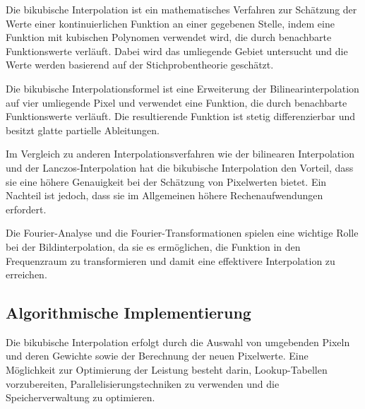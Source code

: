 Die bikubische Interpolation ist ein mathematisches Verfahren zur Schätzung der Werte einer kontinuierlichen Funktion an einer gegebenen Stelle, indem eine Funktion mit kubischen Polynomen verwendet wird, die durch benachbarte Funktionswerte verläuft.
Dabei wird das umliegende Gebiet untersucht und die Werte werden basierend auf der Stichprobentheorie geschätzt.

Die bikubische Interpolationsformel ist eine Erweiterung der Bilinearinterpolation auf vier umliegende Pixel und verwendet eine Funktion, die durch benachbarte Funktionswerte verläuft.
Die resultierende Funktion ist stetig differenzierbar und besitzt glatte partielle Ableitungen.

Im Vergleich zu anderen Interpolationsverfahren wie der bilinearen Interpolation und der Lanczos-Interpolation hat die bikubische Interpolation den Vorteil, dass sie eine höhere Genauigkeit bei der Schätzung von Pixelwerten bietet.
Ein Nachteil ist jedoch, dass sie im Allgemeinen höhere Rechenaufwendungen erfordert.

Die Fourier-Analyse und die Fourier-Transformationen spielen eine wichtige Rolle bei der Bildinterpolation, da sie es ermöglichen, die Funktion in den Frequenzraum zu transformieren und damit eine effektivere Interpolation zu erreichen.

\subsection{Algorithmische Implementierung}



    
Die bikubische Interpolation erfolgt durch die Auswahl von umgebenden Pixeln und deren Gewichte sowie der Berechnung der neuen Pixelwerte.
Eine Möglichkeit zur Optimierung der Leistung besteht darin, Lookup-Tabellen vorzubereiten, Parallelisierungstechniken zu verwenden und die Speicherverwaltung zu optimieren.

